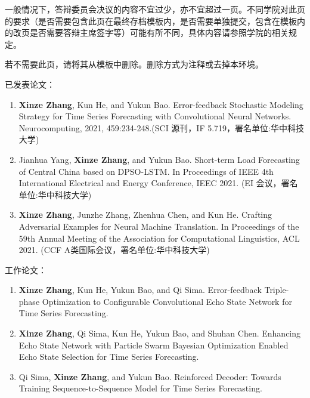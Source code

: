 
\begin{decision}
	一般情况下，答辩委员会决议的内容不宜过少，亦不宜超过一页。不同学院对此页的要求（是否需要包含此页在最终存档模板内，是否需要单独提交，包含在模板内的改页是否需要答辩主席签字等）可能有所不同，具体内容请参照学院的相关规定。 
	
	若不需要此页，请将其从模板中删除。删除方式为注释或去掉本环境。
\end{decision}



\begin{publications}
	已发表论文：
	\renewcommand{\labelenumi}{[\arabic{enumi}]}
	\begin{enumerate}
		\item {
			\textbf{Xinze Zhang}, Kun He, and Yukun Bao. Error-feedback Stochastic Modeling Strategy for Time Series Forecasting with Convolutional Neural Networks. Neurocomputing, 2021, 459:234-248.(SCI 源刊，IF 5.719，署名单位:华中科技大学)
		}
		\item {Jianhua Yang, \textbf{Xinze Zhang}, and Yukun Bao. Short-term Load Forecasting of Central China based on DPSO-LSTM. In Proceedings of IEEE 4th International Electrical and Energy Conference, IEEC 2021. (EI 会议，署名单位:华中科技大学)
		}
		\item {\textbf{Xinze Zhang}, Junzhe Zhang, Zhenhua Chen, and Kun He. Crafting Adversarial Examples for Neural Machine Translation. In Proceedings of the 59th Annual Meeting of the Association for Computational Linguistics, ACL 2021. (CCF A类国际会议，署名单位:华中科技大学)}
	\end{enumerate}
	
	\vspace{1em}
	工作论文：
	\begin{enumerate}
		\item {
			\textbf{Xinze Zhang}, Kun He, Yukun Bao, and Qi Sima. Error-feedback Triple-phase Optimization to Configurable Convolutional Echo State Network for Time Series Forecasting.
		}
		\item {
			\textbf{Xinze Zhang}, Qi Sima, Kun He, Yukun Bao, and Shuhan Chen. Enhancing Echo State Network with Particle Swarm Bayesian Optimization Enabled Echo State Selection for Time Series Forecasting.
		}
		\item {
			Qi Sima, \textbf{Xinze Zhang}, and Yukun Bao. Reinforced Decoder: Towards Training Sequence-to-Sequence Model for Time Series Forecasting.
		}
	\end{enumerate}
	
\end{publications}

